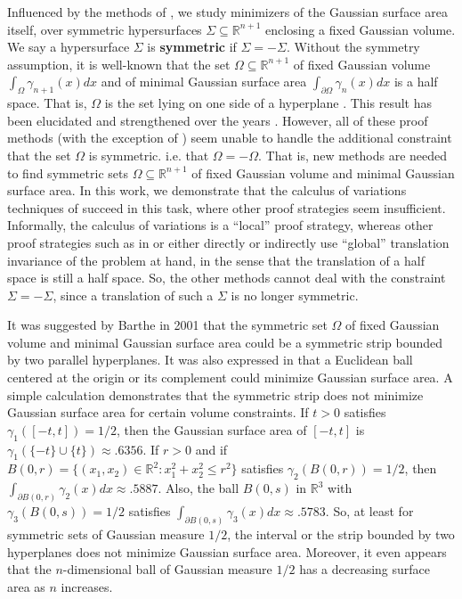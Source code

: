 \documentclass[12pt,reqno]{amsart}
\theoremstyle{definition}
\renewcommand{\subset}{\subseteq}
\newcommand{\R}{\mathbb{R}}
\newcommand{\embolden}[1]{\textbf {#1}}
\newcommand{\sdimn}{n}
\newcommand{\adimn}{n+1}
\begin{document}
Influenced by the methods of \cite{colding12a}, we study minimizers of the Gaussian surface area itself, over symmetric hypersurfaces $\Sigma\subset\R^{\adimn}$ enclosing a fixed Gaussian volume.  We say a hypersurface $\Sigma$ is \embolden{symmetric} if $\Sigma=-\Sigma$.  Without the symmetry assumption, it is well-known that the set $\Omega\subset\R^{\adimn}$ of fixed Gaussian volume $\int_{\Omega}\gamma_{\adimn}(x)dx$ and of minimal Gaussian surface area $\int_{\partial\Omega}\gamma_{\sdimn}(x)dx$ is a half space.  That is, $\Omega$ is the set lying on one side of a hyperplane \cite{sudakov74}.  This result has been elucidated and strengthened over the years \cite{borell85,ledoux94,ledoux96,bobkov97,burchard01,borell03,mossel15,mossel12,eldan13,mcgonagle15,barchiesi16}.  However, all of these proof methods (with the exception of \cite{mcgonagle15,barchiesi16}) seem unable to handle the additional constraint that the set $\Omega$ is symmetric. i.e. that $\Omega=-\Omega$.  That is, new methods are needed to find symmetric sets $\Omega\subset\R^{\adimn}$ of fixed Gaussian volume and minimal Gaussian surface area.  In this work, we demonstrate that the calculus of variations techniques of \cite{colding12a,mcgonagle15,barchiesi16} succeed in this task, where other proof strategies seem insufficient.  Informally, the calculus of variations is a ``local'' proof strategy, whereas other proof strategies such as in \cite{mossel12} or \cite{eldan13} either directly or indirectly use ``global'' translation invariance of the problem at hand, in the sense that the translation of a half space is still a half space.  So, the other methods cannot deal with the constraint $\Sigma=-\Sigma$, since a translation of such a $\Sigma$ is no longer symmetric.

It was suggested by Barthe in 2001 \cite{barthe01} that the symmetric set $\Omega$ of fixed Gaussian volume and minimal Gaussian surface area could be a symmetric strip bounded by two parallel hyperplanes.  It was also expressed in \cite{chakrabarti10,odonnell12} that a Euclidean ball centered at the origin or its complement could minimize Gaussian surface area.  A simple calculation demonstrates that the symmetric strip does not minimize Gaussian surface area for certain volume constraints.  If $t>0$ satisfies $\gamma_{1}([-t,t])=1/2$, then the Gaussian surface area of $[-t,t]$ is $\gamma_{1}(\{-t\}\cup\{t\})\approx .6356$.  If $r>0$ and if $B(0,r)=\{(x_{1},x_{2})\in\R^{2}\colon x_{1}^{2}+x_{2}^{2}\leq r^{2}\}$ satisfies $\gamma_{2}(B(0,r))=1/2$, then $\int_{\partial B(0,r)}\gamma_{2}(x)dx\approx .5887$.  Also, the ball $B(0,s)$ in $\R^{3}$ with $\gamma_{3}(B(0,s))=1/2$ satisfies $\int_{\partial B(0,s)}\gamma_{3}(x)dx\approx .5783$.  So, at least for symmetric sets of Gaussian measure $1/2$, the interval or the strip bounded by two hyperplanes does not minimize Gaussian surface area.  Moreover, it even appears that the $n$-dimensional ball of Gaussian measure $1/2$ has a decreasing surface area as $n$ increases.
\end{document}
